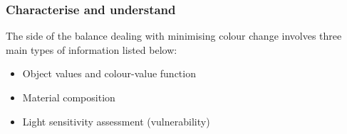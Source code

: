 \newpage
\subsubsection{Characterise and understand}

The side of the balance dealing with minimising colour change involves three main types of information listed below:
\begin{itemize}
    \item Object values and colour-value function 
    \item Material composition
    \item Light sensitivity assessment (vulnerability)
\end{itemize}
	
